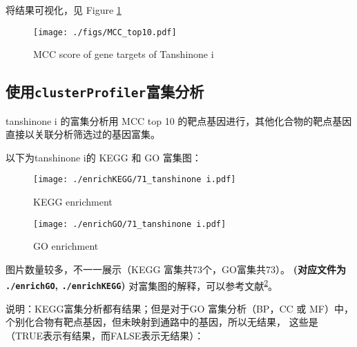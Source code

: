 \documentclass[
]{article}
\begin{document}
将结果可视化，见 Figure \ref{fig:mcc}

\begin{figure}
\centering
\texttt{[image: ./figs/MCC\_top10.pdf]}
\caption{\label{fig:mcc}MCC score of gene targets of Tanshinone i}
\end{figure}

\hypertarget{ux4f7fux7528clusterprofilerux5bccux96c6ux5206ux6790}{%
\subsection{\texorpdfstring{使用\texttt{clusterProfiler}富集分析}{使用clusterProfiler富集分析}}\label{ux4f7fux7528clusterprofilerux5bccux96c6ux5206ux6790}}

tanshinone i 的富集分析用 MCC top 10 的靶点基因进行，其他化合物的靶点基因直接以关联分析筛选过的基因富集。

以下为tanshinone i的 KEGG 和 GO 富集图：

\begin{figure}
\centering
\texttt{[image: ./enrichKEGG/71\_tanshinone i.pdf]}
\caption{\label{fig:sigKEGG}KEGG enrichment}
\end{figure}

\begin{figure}
\centering
\texttt{[image: ./enrichGO/71\_tanshinone i.pdf]}
\caption{\label{fig:sigGO}GO enrichment}
\end{figure}

图片数量较多，不一一展示（KEGG 富集共73个，GO富集共73）。
\textbf{(对应文件为 \texttt{./enrichGO}, \texttt{./enrichKEGG})}
对富集图的解释，可以参考文献\textsuperscript{\protect\hyperlink{ref-IntegrativeAnaLiuY2020}{2}}。

说明：KEGG富集分析都有结果；但是对于GO 富集分析（BP，CC 或 MF）中，个别化合物有靶点基因，但未映射到通路中的基因，所以无结果， 这些是（TRUE表示有结果，而FALSE表示无结果）：
\end{document}
